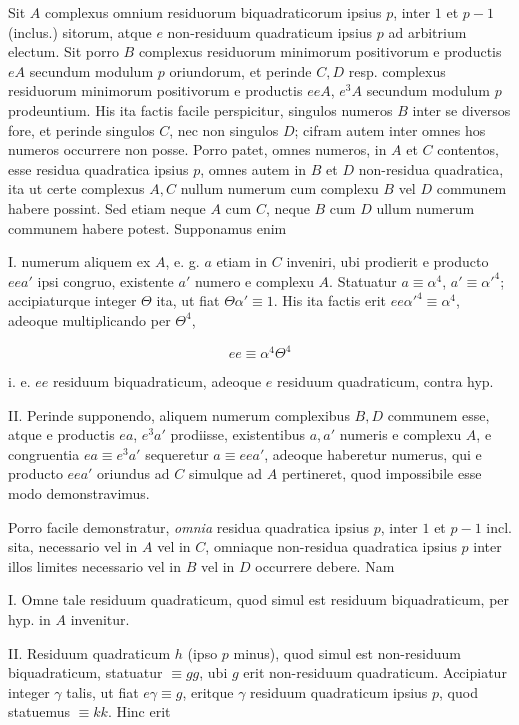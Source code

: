 Sit $A$ complexus omnium residuorum biquadraticorum ipsius $p$, inter $1$ et $p-1$ (inclus.) sitorum, atque $e$ non-residuum quadraticum ipsius $p$ ad arbitrium electum. Sit porro $B$ complexus residuorum minimorum positivorum e productis $eA$ secundum modulum $p$ oriundorum, et perinde $C,D$ resp. complexus residuorum minimorum positivorum e productis $eeA$, $e^3A$ secundum modulum $p$ prodeuntium. His ita factis facile perspicitur, singulos numeros $B$ inter se diversos fore, et perinde singulos $C$, nec non singulos $D$; cifram autem inter omnes hos numeros occurrere non posse. Porro patet, omnes numeros, in $A$ et $C$ contentos, esse residua quadratica ipsius $p$, omnes autem in $B$ et $D$ non-residua quadratica, ita ut certe complexus $A,C$ nullum numerum cum complexu $B$ vel $D$ communem habere possint. Sed etiam neque $A$ cum $C$, neque $B$ cum $D$ ullum numerum communem habere potest. Supponamus enim

I. numerum aliquem ex $A$, e. g. $a$ etiam in $C$ inveniri, ubi prodierit e producto $eea'$ ipsi congruo, existente $a'$ numero e complexu $A$. Statuatur $a\equiv\alpha^4$, $a'\equiv\alpha'^4$; accipiaturque integer $\Theta$ ita, ut fiat $\Theta\alpha'\equiv1$. His ita factis erit $ee\alpha'^4\equiv\alpha^4$, adeoque multiplicando per $\Theta^4$,

\[
ee\equiv\alpha^4\Theta^4
\]

i. e. $ee$ residuum biquadraticum, adeoque $e$ residuum quadraticum, contra hyp.

%
II. Perinde supponendo, aliquem numerum complexibus $B,D$ communem esse, atque e productis $ea$, $e^3a'$ prodiisse, existentibus $a,a'$ numeris e complexu $A$, e congruentia $ea\equiv e^3a'$ sequeretur $a\equiv eea'$, adeoque haberetur numerus, qui e producto $eea'$ oriundus ad $C$ simulque ad $A$ pertineret, quod impossibile esse modo demonstravimus.

Porro facile demonstratur, \emph{omnia} residua quadratica ipsius $p$, inter $1$ et $p-1$ incl. sita, necessario vel in $A$ vel in $C$, omniaque non-residua quadratica ipsius $p$ inter illos limites necessario vel in $B$ vel in $D$ occurrere debere. Nam

I. Omne tale residuum quadraticum, quod simul est residuum biqua\-draticum, per hyp. in $A$ invenitur.

II. Residuum quadraticum $h$ (ipso $p$ minus), quod simul est non-residuum biquadraticum, statuatur $\equiv gg$, ubi $g$ erit non-residuum quadraticum. Accipiatur integer $\gamma$ talis, ut fiat $e\gamma\equiv g$, eritque $\gamma$ residuum quadraticum ipsius $p$, quod statuemus $\equiv kk$. Hinc erit

